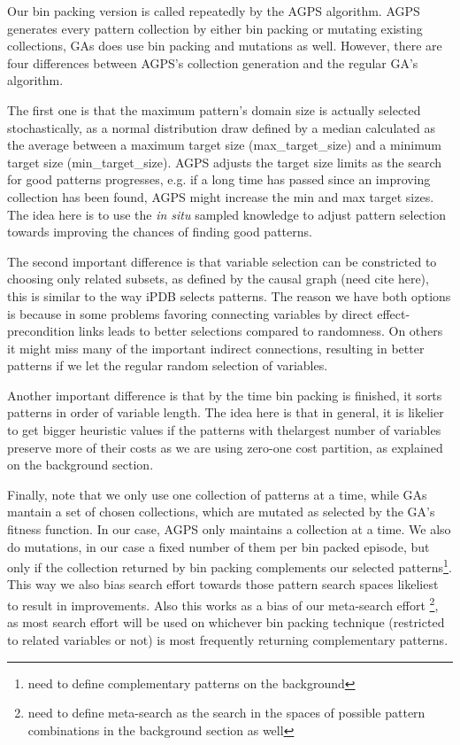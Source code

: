 \documentclass{article}
\begin{document}
Our bin packing version is called repeatedly by the AGPS algorithm.  AGPS generates every pattern collection by either bin packing or mutating existing collections, GAs does use bin packing and mutations as well.  However, there are four differences between AGPS's collection generation and the regular GA's algorithm.

The first one is that the maximum pattern's domain size is actually selected stochastically, as a normal distribution draw defined by a median calculated as the average between a maximum target size (max\_target\_size) and a minimum target size (min\_target\_size). AGPS adjusts the target size limits as the search for good patterns progresses, e.g. if a long time has passed since an improving collection has been found, AGPS might increase the min and max target sizes.  The idea here is to use the \emph{in situ} sampled knowledge to adjust pattern selection towards improving the chances of finding good patterns.  

The second important difference is that variable selection can be constricted to choosing only related subsets, as defined by the causal graph (need cite here), this is similar to the way iPDB selects patterns.  The reason we have both options is because in some problems favoring connecting variables by direct effect-precondition links leads to better selections compared to randomness.  On others it might miss many of the important indirect connections, resulting in better patterns if we let the regular random selection of variables. 

Another important difference is that by the time bin packing is finished, it sorts patterns in order of variable length.  The idea here is that in general, it is likelier to get bigger heuristic values if the patterns with thelargest number of variables preserve more of their costs as we are using zero-one cost partition, as explained on the background section.

Finally, note that we only use one collection of patterns at a time, while GAs mantain a set of chosen collections, which are mutated as selected by the GA's fitness function. In our case, AGPS only maintains a collection at a time.  We also do mutations, in our case a fixed number of them per bin packed episode, but only if the collection returned by bin packing complements our selected patterns\footnote{need to define complementary patterns on the background}.  This way we also bias search effort towards those pattern search spaces likeliest to result in improvements.  Also this works as a bias of our meta-search effort \footnote{need to define meta-search as the search in the spaces of possible pattern combinations in the background section as well}, as most search effort will be used on whichever bin packing technique (restricted to related variables or not) is most frequently returning complementary patterns.




\end{document}
